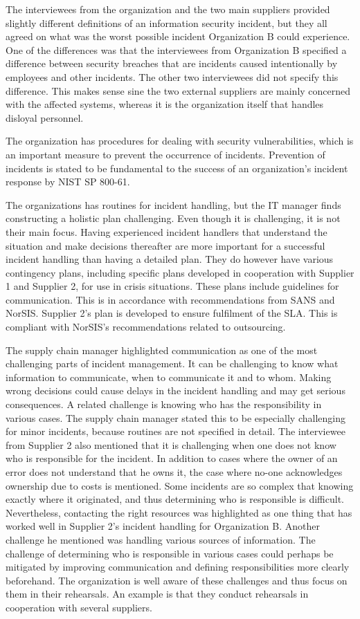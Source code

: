 The interviewees from the organization and the two main suppliers provided slightly different definitions of an information security incident, but they all agreed on what was the worst possible incident Organization B could experience. One of the differences was that the interviewees from Organization B specified a difference between security breaches that are incidents caused intentionally by employees and other incidents. The other two interviewees did not specify this difference. This makes sense sine the two external suppliers are mainly concerned with the affected systems, whereas it is the organization itself that handles disloyal personnel.

The organization has procedures for dealing with security vulnerabilities, which is an important measure to prevent the occurrence of incidents. Prevention of incidents is stated to be fundamental to the success of an organization's incident response by NIST SP 800-61.

The organizations has routines for incident handling, but the IT manager finds constructing a holistic plan challenging. Even though it is challenging, it is not their main focus. Having experienced incident handlers that understand the situation and make decisions thereafter are more important for a successful incident handling than having a detailed plan. They do however have various contingency plans, including specific plans developed in cooperation with Supplier 1 and Supplier 2, for use in crisis situations. These plans include guidelines for communication. This is in accordance with recommendations from SANS and NorSIS. Supplier 2's plan is developed to ensure fulfilment of the \ac{SLA}. This is compliant with NorSIS's recommendations related to outsourcing.

The supply chain manager highlighted communication as one of the most challenging parts of incident management. It can be challenging to know what information to communicate, when to communicate it and to whom. Making wrong decisions could cause delays in the incident handling and may get serious consequences. A related challenge is knowing who has the responsibility in various cases. The supply chain manager stated this to be especially challenging for minor incidents, because routines are not specified in detail. The interviewee from Supplier 2 also mentioned that it is challenging when one does not know who is responsible for the incident. In addition to cases where the owner of an error does not understand that he owns it, the case where no-one acknowledges ownership due to costs is mentioned. Some incidents are so complex that knowing exactly where it originated, and thus determining who is responsible is difficult. Nevertheless, contacting the right resources was highlighted as one thing that has worked well in Supplier 2's incident handling for Organization B. Another challenge he mentioned was handling various sources of information. The challenge of determining who is responsible in various cases could perhaps be mitigated by improving communication and defining responsibilities more clearly beforehand. The organization is well aware of these challenges and thus focus on them in their rehearsals. An example is that they conduct rehearsals in cooperation with several suppliers.

